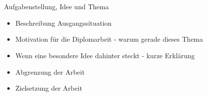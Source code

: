 \chapter{\docname}
\label{\docname}

\color{red}
Aufgabenstellung, Idee und Thema

\begin{itemize}
	\item Beschreibung Ausgangssituation
	\item Motivation für die Diplomarbeit - warum gerade dieses Thema
	\item Wenn eine besondere Idee dahinter steckt - kurze Erklärung 
	\item Abgrenzung der Arbeit
	\item Zielsetzung der Arbeit
\end{itemize}

\color{black}
